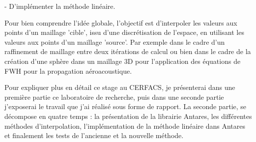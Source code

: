 - D'implémenter la méthode linéaire.  %

\vspace{0,5cm}

Pour bien comprendre l'idée globale, l'objectif est d'interpoler les valeurs aux points d'un maillage 'cible', issu d'une discrétisation de l'espace, en utilisant les valeurs aux points d'un maillage 'source'.
Par exemple dans le cadre d'un raffinement de maillage entre deux itérations de calcul ou bien dans le cadre de la création d'une sphère dans un maillage 3D pour l'application des équations de FWH pour la propagation aéroacoustique.

\vspace{0,5cm}

Pour expliquer plus en détail ce stage au CERFACS, je présenterai dans une première partie ce laboratoire de recherche, puis dans une seconde partie j'exposerai le travail que j'ai réalisé sous forme de rapport. La seconde partie, se décompose en quatre temps : la présentation de la librairie Antares, les différentes méthodes d'interpolation, l'implémentation de la méthode linéaire dans Antares et finalement les tests de l'ancienne et la nouvelle méthode.